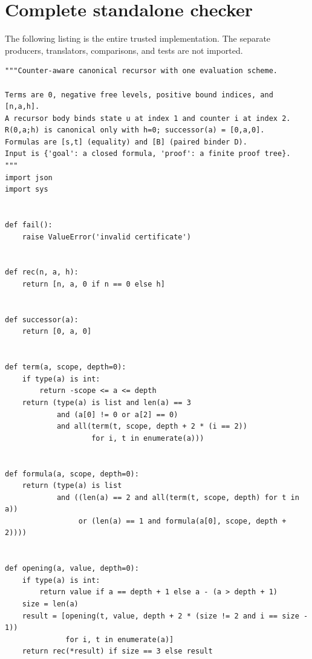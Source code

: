 \documentclass[11pt,letterpaper]{article}
\theoremstyle{definition}
\begin{document}
\section{Complete standalone checker}\label{app:checker}
The following listing is the entire trusted implementation. The
separate producers, translators, comparisons, and tests are not imported.
\begin{lstlisting}
"""Counter-aware canonical recursor with one evaluation scheme.

Terms are 0, negative free levels, positive bound indices, and [n,a,h].
A recursor body binds state u at index 1 and counter i at index 2.
R(0,a;h) is canonical only with h=0; successor(a) = [0,a,0].
Formulas are [s,t] (equality) and [B] (paired binder D).
Input is {'goal': a closed formula, 'proof': a finite proof tree}.
"""
import json
import sys


def fail():
    raise ValueError('invalid certificate')


def rec(n, a, h):
    return [n, a, 0 if n == 0 else h]


def successor(a):
    return [0, a, 0]


def term(a, scope, depth=0):
    if type(a) is int:
        return -scope <= a <= depth
    return (type(a) is list and len(a) == 3
            and (a[0] != 0 or a[2] == 0)
            and all(term(t, scope, depth + 2 * (i == 2))
                    for i, t in enumerate(a)))


def formula(a, scope, depth=0):
    return (type(a) is list
            and ((len(a) == 2 and all(term(t, scope, depth) for t in a))
                 or (len(a) == 1 and formula(a[0], scope, depth + 2))))


def opening(a, value, depth=0):
    if type(a) is int:
        return value if a == depth + 1 else a - (a > depth + 1)
    size = len(a)
    result = [opening(t, value, depth + 2 * (size != 2 and i == size - 1))
              for i, t in enumerate(a)]
    return rec(*result) if size == 3 else result



\end{lstlisting}
\end{document}
